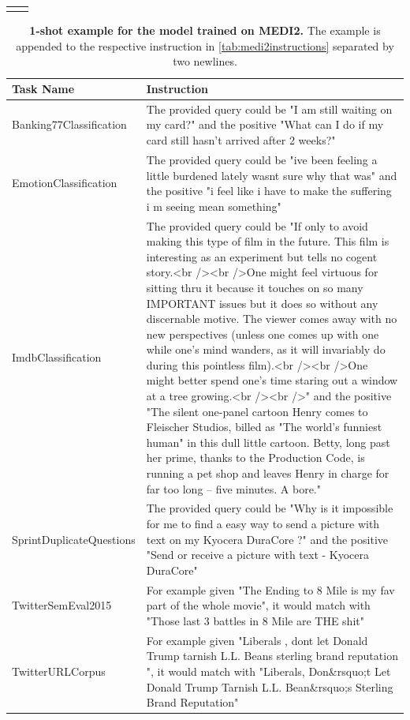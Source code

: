 \documentclass{article}
\begin{document}
\begin{longtable}{lp{9cm}}
\bottomrule
\label{tab:e5fewshots}
\end{longtable}

\setlength\extrarowheight{5pt}
\begin{longtable}{lp{9cm}}
\caption{\textbf{1-shot example for the model trained on MEDI2.} The example is appended to the respective instruction in \autoref{tab:medi2instructions} separated by two newlines.}\\
\toprule
Task Name & Instruction \\
\midrule
Banking77Classification & The provided query could be "I am still waiting on my card?" and the positive "What can I
do if my card still hasn't arrived after 2 weeks?"\\
EmotionClassification & The provided query could be "ive been feeling a little burdened lately wasnt sure why that was" and the positive "i feel like i have to make the suffering i m seeing mean something"\\
ImdbClassification & The provided query could be "If only to avoid making this type of film in the future. This film is interesting as an experiment but tells no cogent story.<br /><br />One might feel virtuous for sitting thru it because it touches on so many IMPORTANT issues but it does so without any discernable motive. The viewer comes away with no new perspectives (unless one comes up with one while one's mind wanders, as it will invariably do during this pointless film).<br /><br />One might better spend one's time staring out a window at a tree growing.<br /><br />" and the positive "The silent one-panel cartoon Henry comes to Fleischer Studios, billed as "The world's funniest human" in this dull little cartoon. Betty, long past her prime, thanks to the Production Code, is running a pet shop and leaves Henry in charge for far too long -- five minutes. A bore." \\
\midrule
SprintDuplicateQuestions & The provided query could be "Why is it impossible for me to find a easy way to send a picture with text on my Kyocera DuraCore ?" and the positive "Send or receive a picture with text - Kyocera DuraCore" \\
TwitterSemEval2015 & For example given "The Ending to 8 Mile is my fav part of the whole movie", it would match with "Those last 3 battles in 8 Mile are THE shit" \\
TwitterURLCorpus & For example given "Liberals , dont let Donald Trump tarnish L.L. Beans sterling brand reputation ", it would match with "Liberals, Don\&rsquo;t Let Donald Trump Tarnish L.L. Bean\&rsquo;s Sterling Brand Reputation" \\

\end{longtable}
\end{document}
